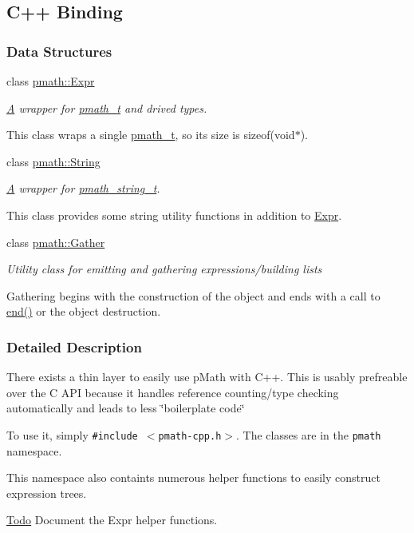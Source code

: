\hypertarget{group__cpp__binding}{
\subsection{C++ Binding}
\label{group__cpp__binding}
}
\subsubsection*{Data Structures}
\begin{CompactItemize}
\item 
class \hyperlink{classpmath_1_1_expr}{pmath::Expr}
\begin{CompactList}\small\item\em \hyperlink{class_a}{A} wrapper for \hyperlink{classpmath__t}{pmath\_\-t} and drived types.

This class wraps a single \hyperlink{classpmath__t}{pmath\_\-t}, so its size is sizeof(void$\ast$). \item\end{CompactList}\item 
class \hyperlink{classpmath_1_1_string}{pmath::String}
\begin{CompactList}\small\item\em \hyperlink{class_a}{A} wrapper for \hyperlink{classpmath__string__t}{pmath\_\-string\_\-t}.

This class provides some string utility functions in addition to \hyperlink{classpmath_1_1_expr}{Expr}. \item\end{CompactList}\item 
class \hyperlink{classpmath_1_1_gather}{pmath::Gather}
\begin{CompactList}\small\item\em Utility class for emitting and gathering expressions/building lists

Gathering begins with the construction of the object and ends with a call to \hyperlink{classpmath_1_1_gather_d686bb5cc8ffc544bff3f7aaa3723061}{end()} or the object destruction. \item\end{CompactList}\end{CompactItemize}


\subsubsection{Detailed Description}
There exists a thin layer to easily use pMath with C++. This is usably prefreable over the C API because it handles reference counting/type checking automatically and leads to less \char`\"{}boilerplate code\char`\"{}

To use it, simply {\tt \#include $<$pmath-cpp.h$>$}. The classes are in the {\tt pmath} namespace.

This namespace also containts numerous helper functions to easily construct expression trees.

\begin{Desc}
\item[\hyperlink{todo__todo000001}{Todo}]Document the Expr helper functions.\end{Desc}
